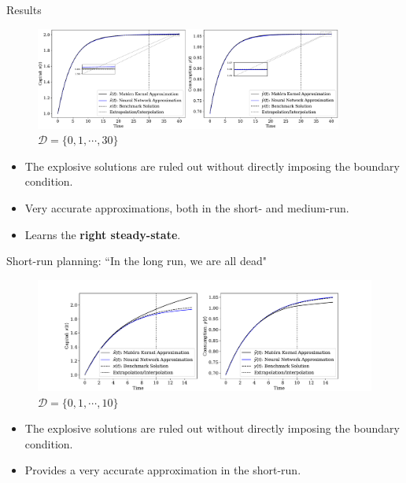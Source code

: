 \documentclass[aspectratio=169,10pt]{beamer}
\newcommand{\emphcolor}[1]{\textbf{\textcolor{emphcolorval}{#1}}}
\begin{document}
\begin{frame}{Results}
	\label{ncg:results}
		\begin{figure}[t!]
		\centering
		\includegraphics[width=0.9\textwidth]{figs/neoclassical_growth_model_2_by_1.pdf}
		\caption*{$\mathcal{D} = \{0,1,\cdots,30\}$}
		\vspace{-4mm}
	\end{figure}
	\begin{itemize}
		\item The explosive solutions are ruled out without directly imposing the boundary condition.
		\vspace{0.1in}
		\item Very accurate approximations, both in the short- and medium-run.
		\vspace{0.1in}
		\item Learns the  \emphcolor{right steady-state}. \hyperlink{errors}{}
	\end{itemize}
		
\end{frame}

\begin{frame}{Short-run planning: ``In the long run, we are all dead" }
	\begin{figure}[t!]
		\centering
		\includegraphics[width=\textwidth]{figs/neoclassical_growth_short_planning.pdf}
		\caption*{$\mathcal{D} = \{0,1,\cdots,10\}$}
		\vspace{-4mm}
	\end{figure}
	\begin{itemize}
		\item The explosive solutions are ruled out without directly imposing the boundary condition.
		\vspace{0.1in}
		\item Provides a very accurate approximation in the short-run.
	\end{itemize}
\end{frame}
\end{document}
